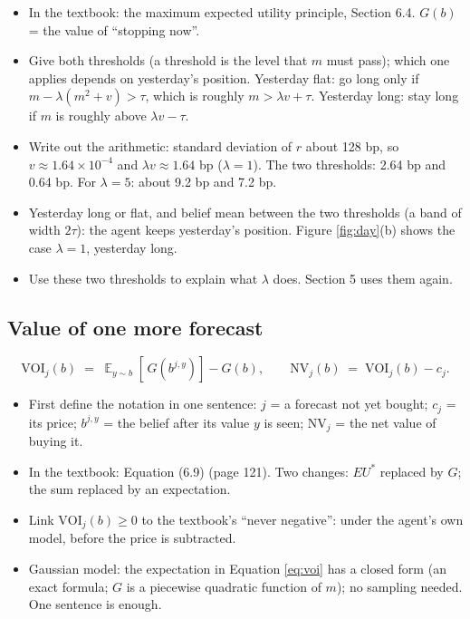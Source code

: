 \documentclass{article}
\newenvironment{pts}{\begin{itemize}[nosep,leftmargin=1.15em,topsep=1pt]}{\end{itemize}}
\DeclareMathOperator{\E}{\mathbb{E}}
\begin{document}
\begin{note}
\begin{pts}
\item In the textbook: the maximum expected utility principle, Section 6.4. $G(b)$ = the value of ``stopping now''.
\item Give both thresholds (a threshold is the level that $m$ must pass); which one applies depends on yesterday's position. Yesterday flat: go long only if $m - \lambda(m^{2}+v) > \tau$, which is roughly $m > \lambda v + \tau$. Yesterday long: stay long if $m$ is roughly above $\lambda v - \tau$.
\item Write out the arithmetic: standard deviation of $r$ about 128 bp, so $v \approx 1.64\times10^{-4}$ and $\lambda v \approx 1.64$ bp ($\lambda=1$). The two thresholds: 2.64 bp and 0.64 bp. For $\lambda=5$: about 9.2 bp and 7.2 bp.
\item Yesterday long or flat, and belief mean between the two thresholds (a band of width $2\tau$): the agent keeps yesterday's position. Figure \ref{fig:day}(b) shows the case $\lambda=1$, yesterday long.
\item Use these two thresholds to explain what $\lambda$ does. Section 5 uses them again.
\end{pts}
\end{note}

\subsection{Value of one more forecast}

\begin{equation}
\mathrm{VOI}_j(b) \;=\; \E_{y \sim b}\!\left[\,G\!\left(b^{j,y}\right)\right] - G(b),
\qquad
\mathrm{NV}_j(b) \;=\; \mathrm{VOI}_j(b) - c_j .
\label{eq:voi}
\end{equation}

\begin{note}
\begin{pts}
\item First define the notation in one sentence: $j$ = a forecast not yet bought; $c_j$ = its price; $b^{j,y}$ = the belief after its value $y$ is seen; $\mathrm{NV}_j$ = the net value of buying it.
\item In the textbook: Equation (6.9) (page 121). Two changes: $EU^{*}$ replaced by $G$; the sum replaced by an expectation.
\item Link $\mathrm{VOI}_j(b) \ge 0$ to the textbook's ``never negative'': under the agent's own model, before the price is subtracted.
\item Gaussian model: the expectation in Equation \eqref{eq:voi} has a closed form (an exact formula; $G$ is a piecewise quadratic function of $m$); no sampling needed. One sentence is enough.
\end{pts}
\end{note}
\end{document}
